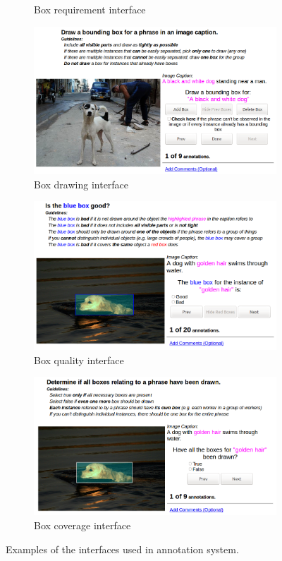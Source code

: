 \begin{figure}
\begin{subfigure}{.45\textwidth}
    \caption{Box requirement interface}
    \label{fig:flickr30k-example-box-requirement}
  \end{subfigure}
  \begin{subfigure}{.45\textwidth}
    \centering
    \includegraphics[width=.8\linewidth]{figures/flickr30k-example-box-drawing.png}
    \caption{Box drawing interface}
    \label{fig:flickr30k-example-box-drawing}
  \end{subfigure}
  \begin{subfigure}{.45\textwidth}
    \centering
    \includegraphics[width=.8\linewidth]{figures/flickr30k-example-box-quality.png}
    \caption{Box quality interface}
    \label{fig:flickr30k-example-box-quality}
  \end{subfigure}
  \begin{subfigure}{.45\textwidth}
    \centering
    \includegraphics[width=.8\linewidth]{figures/flickr30k-example-box-coverage.png}
    \caption{Box coverage interface}
    \label{fig:flickr30k-example-box-coverage}
  \end{subfigure}
  \caption{Examples of the interfaces used in \cite{plummer2015flickr30k} annotation system.}
  \label{fig:flickr30k-example}
\end{figure}

